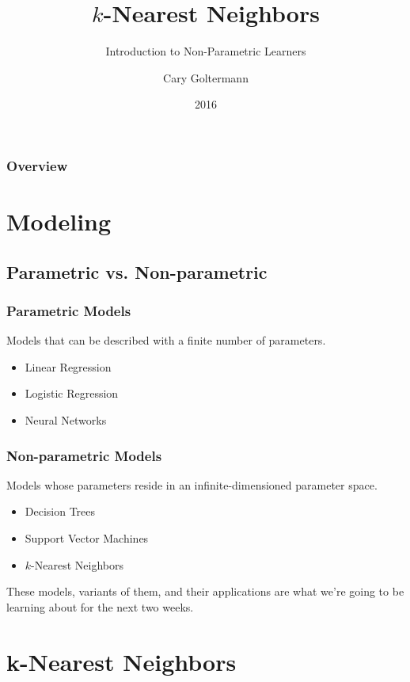 \documentclass{beamer}
\title{$k$-Nearest Neighbors}
\subtitle{Introduction to Non-Parametric Learners}
\author{Cary Goltermann}
\institute{Galvanize}
\date{2016}
\begin{document}
\frame{\titlepage}

\begin{frame}
  \frametitle{Overview}
  \tableofcontents[]
\end{frame}

\section{Modeling}
\subsection{Parametric vs. Non-parametric}
\begin{frame}
  \frametitle{Parametric Models}
  Models that can be described with a finite number of parameters. \vspace{4mm}

  \begin{itemize}
    \item Linear Regression
    \item Logistic Regression
    \item Neural Networks
  \end{itemize}
\end{frame}

\begin{frame}
  \frametitle{Non-parametric Models}
  Models whose parameters reside in an infinite-dimensioned parameter space. \vspace{4mm}

  \begin{itemize}
    \item Decision Trees
    \item Support Vector Machines
    \item $k$-Nearest Neighbors
  \end{itemize} \vspace{4mm}

  These models, variants of them, and their applications are what we're going to be learning about for the next two weeks.
\end{frame}

\section{k-Nearest Neighbors}
\end{document}
